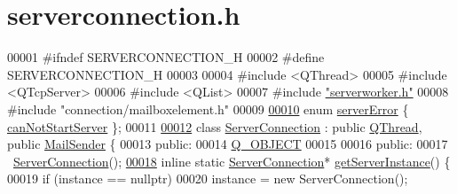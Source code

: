 \hypertarget{a00104_source}{}\section{serverconnection.\+h}
\label{a00104_source}

\begin{DoxyCode}
00001 \textcolor{preprocessor}{#}\textcolor{preprocessor}{ifndef} \textcolor{preprocessor}{SERVERCONNECTION\_H}
00002 \textcolor{preprocessor}{#}\textcolor{preprocessor}{define} \textcolor{preprocessor}{SERVERCONNECTION\_H}
00003 
00004 \textcolor{preprocessor}{#}\textcolor{preprocessor}{include} \textcolor{preprocessor}{<}\textcolor{preprocessor}{QThread}\textcolor{preprocessor}{>}
00005 \textcolor{preprocessor}{#}\textcolor{preprocessor}{include} \textcolor{preprocessor}{<}\textcolor{preprocessor}{QTcpServer}\textcolor{preprocessor}{>}
00006 \textcolor{preprocessor}{#}\textcolor{preprocessor}{include} \textcolor{preprocessor}{<}\textcolor{preprocessor}{QList}\textcolor{preprocessor}{>}
00007 \textcolor{preprocessor}{#}\textcolor{preprocessor}{include} \hyperlink{a00110}{"serverworker.h"}
00008 \textcolor{preprocessor}{#}\textcolor{preprocessor}{include} \textcolor{preprocessor}{"connection/mailboxelement.h"}
00009 
\hyperlink{a00104_a65727a063024ff0dedf1ac2f087f4165}{00010} \textcolor{keyword}{enum} \hyperlink{a00104_a65727a063024ff0dedf1ac2f087f4165}{serverError} \{ \hyperlink{a00104_a65727a063024ff0dedf1ac2f087f4165af21059407733b78da140dbc07981a44a}{canNotStartServer} \};
00011 
\hyperlink{a00181}{00012} \textcolor{keyword}{class} \hyperlink{a00181_af558fe509b60eb019281316513f6d188}{ServerConnection} : \textcolor{keyword}{public} \hyperlink{a00181_af558fe509b60eb019281316513f6d188}{QThread}, \textcolor{keyword}{public} 
      \hyperlink{a00205}{MailSender} \{
00013  \textcolor{keyword}{public}:
00014   \hyperlink{a00181_af558fe509b60eb019281316513f6d188}{Q\_OBJECT}
00015 
00016  \textcolor{keyword}{public}:
00017   ~\hyperlink{a00181_af558fe509b60eb019281316513f6d188}{ServerConnection}();
\hyperlink{a00181_ad64d541093e285a983911f22ab9a0bff}{00018}   \textcolor{keyword}{inline} \textcolor{keyword}{static} \hyperlink{a00181_af558fe509b60eb019281316513f6d188}{ServerConnection}* \hyperlink{a00181_ad64d541093e285a983911f22ab9a0bff}{getServerInstance}() \{
00019     \textcolor{keywordflow}{if} (instance == nullptr)
00020       instance = \textcolor{keyword}{new} ServerConnection();

\end{DoxyCode}
